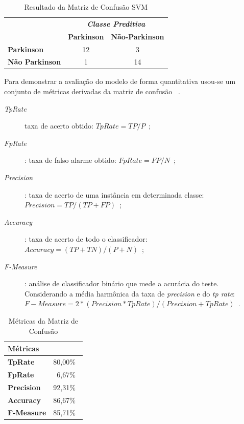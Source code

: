 \begin{table}[!htbp]
\caption{Resultado da Matriz de Confusão SVM}
\label{table:resultadomatrizconfusaosvm}
\centering
\begin{tabular}{l|c|c|}
\cline{2-3}
\multicolumn{1}{c}{}                         & \multicolumn{2}{|c|}{\textit{\textbf{Classe Preditiva}}} \\ \cline{2-3} 
                                             & \textbf{Parkinson}      & \textbf{Não-Parkinson}         \\ \hline
\multicolumn{1}{|l|}{\textbf{Parkinson}} & 12       & 3           \\ \hline
\multicolumn{1}{|l|}{\textbf{Não Parkinson}}     & 1           & 14     \\ \hline
\end{tabular}

\end{table}


 Para demonstrar a avaliação do modelo de forma quantitativa usou-se um conjunto de métricas derivadas da matriz de confusão ~\cite{datamining2005}.
 \begin{description}
 	\item [\textit{TpRate}] taxa de acerto obtido: $ TpRate = TP/P $\ ;
 	\item [\textit{FpRate}]: taxa de falso alarme obtido: $ FpRate = FP/N $\ ;
 	\item [\textit{Precision}]: taxa de acerto de uma instância em determinada classe: $ Precision =  TP/(TP +FP) $\ ;
 	\item [\textit{Accuracy}]: taxa de acerto de todo o classificador: $ Accuracy = (TP+TN)/(P+N) $\ ;
 	\item [\textit{F-Measure}]: análise de classificador binário que mede a acurácia do teste. Considerando a média harmônica da taxa de \textit{precision} e do \textit{tp rate}: $ F-Measure = 2 * (Precision * TpRate)/(Precision + TpRate) $\ .
 \end{description}



\begin{table}[!htbp]
\label{table:metricasmatrizconfusao}
\caption{Métricas da Matriz de Confusão}
\centering
\begin{tabular}{|l|r|}
\hline
\multicolumn{2}{|l|}{\textbf{Métricas}} \\ \hline
\textbf{TpRate}                    & 80,00$\%$\                 \\ \hline
\textbf{FpRate}                    & 6,67$\%$\                \\ \hline
\textbf{Precision}                 & 92,31$\%$\                \\ \hline
\textbf{Accuracy}                  & 86,67$\%$\                \\ \hline
\textbf{F-Measure}                 & 85,71$\%$\                \\ \hline
\end{tabular}
\end{table}






